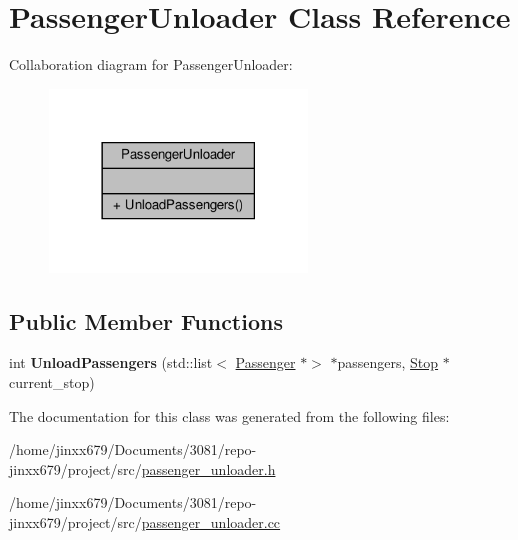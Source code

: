 \hypertarget{classPassengerUnloader}{}\section{Passenger\+Unloader Class Reference}
\label{classPassengerUnloader}


Collaboration diagram for Passenger\+Unloader\+:\nopagebreak
\begin{figure}[H]
\begin{center}
\leavevmode
\includegraphics[width=194pt]{classPassengerUnloader__coll__graph}
\end{center}
\end{figure}
\subsection*{Public Member Functions}
\begin{DoxyCompactItemize}
\item 
\mbox{\label{classPassengerUnloader_a571ee51523a6bce30fb843174eaad4a2}} 
int {\bfseries Unload\+Passengers} (std\+::list$<$ \hyperlink{classPassenger}{Passenger} $\ast$$>$ $\ast$passengers, \hyperlink{classStop}{Stop} $\ast$current\+\_\+stop)
\end{DoxyCompactItemize}


The documentation for this class was generated from the following files\+:\begin{DoxyCompactItemize}
\item 
/home/jinxx679/\+Documents/3081/repo-\/jinxx679/project/src/\hyperlink{passenger__unloader_8h}{passenger\+\_\+unloader.\+h}\item 
/home/jinxx679/\+Documents/3081/repo-\/jinxx679/project/src/\hyperlink{passenger__unloader_8cc}{passenger\+\_\+unloader.\+cc}\end{DoxyCompactItemize}

